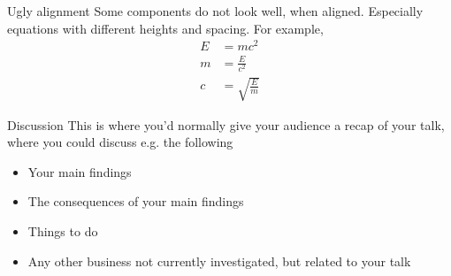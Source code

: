 \documentclass[aspectratio=169]{beamer}
\begin{document}
\begin{frame}[label=ua]{Ugly alignment}
Some components do not look well, when aligned. Especially equations with different heights and spacing. For example,
\begin{align}
    E &= mc^2 \\
    m &= \frac{E}{c^2} \\
    c &= \sqrt{\frac{E}{m}}
\end{align}
\end{frame}


\begin{frame}[label=dis]{Discussion}
This is where you’d normally give your audience a recap of your talk, where you could discuss e.g. the following
\begin{itemize}
    \item Your main findings
    \item The consequences of your main findings
    \item Things to do
    \item Any other business not currently investigated, but related to your talk
\end{itemize}
\end{frame}
\end{document}
